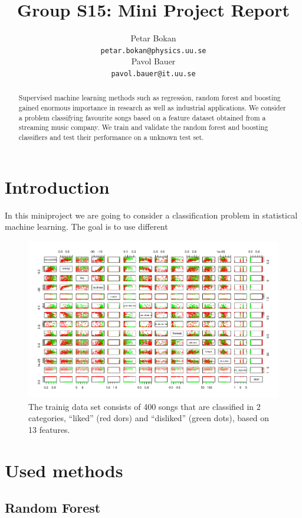 \documentclass{article}
\title{Group S15: Mini Project Report}
\author{
  Petar Bokan \\
  \texttt{petar.bokan@physics.uu.se} \\
   \And
  Pavol Bauer \\
  \texttt{pavol.bauer@it.uu.se} \\
}
\begin{document}

\maketitle

\begin{abstract}
Supervised machine learning methods such as regression, random forest and boosting gained enormous importance in research as well as industrial applications.
We consider a problem classifying favourite songs based on a feature dataset obtained from a streaming music company.
We train and validate the random forest and boosting classifiers and test their performance on a unknown test set.

\end{abstract}

\section{Introduction}

In this miniproject we are going to consider a classification problem in statistical machine learning.
The goal is to use different 

\begin{figure}[htp!]
  \centering
  \includegraphics[height=0.5\textwidth] {figs/song_pairs.png}
  \caption{The trainig data set consists of 400 songs that are classified in 2 categories, ``liked'' (red dors) and ``disliked'' (green dots), based on 13 features.}
  \label{fig:figure2}
\end{figure}

\section{Used methods}

\subsection{Random Forest}
\end{document}
